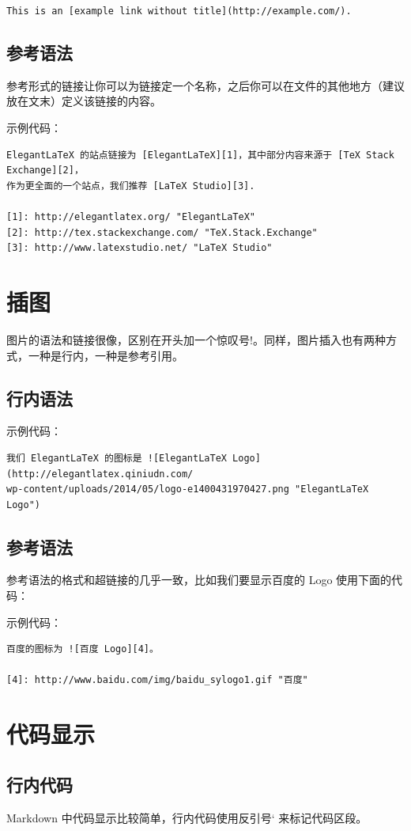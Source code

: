 \verb|This is an [example link without title](http://example.com/).|


\subsection{参考语法}
参考形式的链接让你可以为链接定一个名称，之后你可以在文件的其他地方（建议放在文末）定义该链接的内容。

示例代码：
\begin{verbatim}
ElegantLaTeX 的站点链接为 [ElegantLaTeX][1]，其中部分内容来源于 [TeX Stack Exchange][2]，
作为更全面的一个站点，我们推荐 [LaTeX Studio][3].

[1]: http://elegantlatex.org/ "ElegantLaTeX"
[2]: http://tex.stackexchange.com/ "TeX.Stack.Exchange"
[3]: http://www.latexstudio.net/ "LaTeX Studio"
\end{verbatim}


\section{插图}
图片的语法和链接很像，区别在开头加一个惊叹号!。同样，图片插入也有两种方式，一种是行内，一种是参考引用。


\subsection{行内语法}
示例代码：
\begin{verbatim}
我们 ElegantLaTeX 的图标是 ![ElegantLaTeX Logo](http://elegantlatex.qiniudn.com/
wp-content/uploads/2014/05/logo-e1400431970427.png "ElegantLaTeX Logo")
\end{verbatim}


\subsection{参考语法}
参考语法的格式和超链接的几乎一致，比如我们要显示百度的 Logo 使用下面的代码：

示例代码：
\begin{verbatim}
百度的图标为 ![百度 Logo][4]。

[4]: http://www.baidu.com/img/baidu_sylogo1.gif "百度"
\end{verbatim}


\section{代码显示}
\subsection{行内代码}
Markdown 中代码显示比较简单，行内代码使用反引号` 来标记代码区段。

